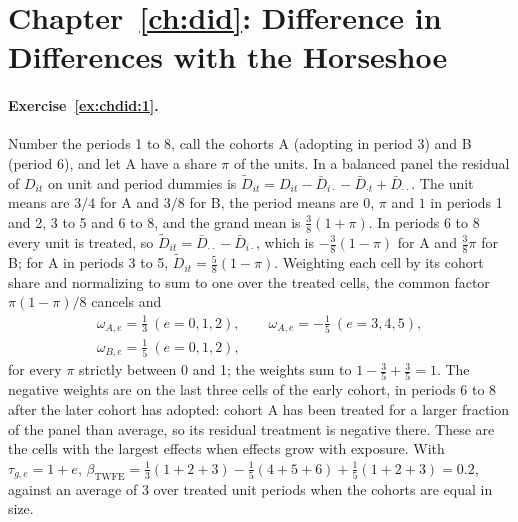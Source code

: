 \section*{Chapter~\ref{ch:did}: Difference in Differences with the Horseshoe}

\paragraph{Exercise~\ref{ex:chdid:1}.} Number the periods 1 to 8, call the cohorts A (adopting in period 3) and B (period 6), and let A have a share $\pi$ of the units. In a balanced panel the residual of $D_{it}$ on unit and period dummies is $\tilde D_{it} = D_{it} - \bar D_{i\cdot} - \bar D_{\cdot t} + \bar D_{\cdot\cdot}$. The unit means are $3/4$ for A and $3/8$ for B, the period means are $0$, $\pi$ and $1$ in periods 1 and 2, 3 to 5 and 6 to 8, and the grand mean is $\tfrac38(1 + \pi)$. In periods 6 to 8 every unit is treated, so $\tilde D_{it} = \bar D_{\cdot\cdot} - \bar D_{i\cdot}$, which is $-\tfrac38(1 - \pi)$ for A and $\tfrac38\pi$ for B; for A in periods 3 to 5, $\tilde D_{it} = \tfrac58(1 - \pi)$. Weighting each cell by its cohort share and normalizing to sum to one over the treated cells, the common factor $\pi(1 - \pi)/8$ cancels and
\[
\begin{gathered}
\omega_{A,e} = \tfrac13\ (e = 0, 1, 2), \qquad \omega_{A,e} = -\tfrac15\ (e = 3, 4, 5), \\
\omega_{B,e} = \tfrac15\ (e = 0, 1, 2),
\end{gathered}
\]
for every $\pi$ strictly between 0 and 1; the weights sum to $1 - \tfrac35 + \tfrac35 = 1$. The negative weights are on the last three cells of the early cohort, in periods 6 to 8 after the later cohort has adopted: cohort A has been treated for a larger fraction of the panel than average, so its residual treatment is negative there. These are the cells with the largest effects when effects grow with exposure. With $\tau_{g,e} = 1 + e$, $\beta_{\mathrm{TWFE}} = \tfrac13(1 + 2 + 3) - \tfrac15(4 + 5 + 6) + \tfrac15(1 + 2 + 3) = 0.2$, against an average of 3 over treated unit periods when the cohorts are equal in size.

